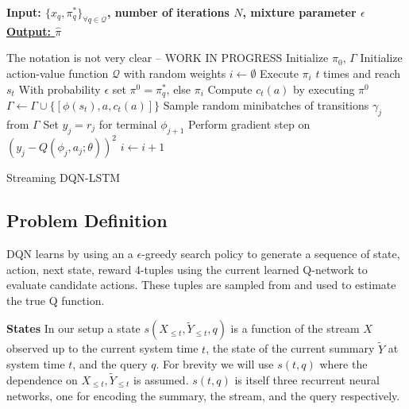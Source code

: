 \documentclass[12pt]{article}
\begin{document}
\begin{algorithm}
    \bf{Input:} { \rm $\{ x_q, \pi^{*}_q \}_{\forall q \in \mathcal{Q} }$, number of iterations $N$, mixture parameter $\epsilon$  } \\
    \underline{\bf{Output:}  $\hat{\pi}$ }
  \begin{algorithmic}[1]
  \STATE The notation is not very clear -- WORK IN PROGRESS
  \STATE \rm Initialize $\pi_0$, $\Gamma$
  \STATE \rm Initialize action-value function $\mathcal{Q}$ with random weights
    \STATE \rm $i \leftarrow \emptyset$ 
        \STATE \rm Execute $\pi_i$ $t$ times and reach $s_t$
        		\STATE \rm With probability $\epsilon$ set $\pi^0 = \pi^{*}_q$, else $\pi_i$
		\STATE Compute $c_t(a)$ by executing $\pi^0$
		\STATE $\Gamma \leftarrow \Gamma \cup \{ [\phi(s_t), a, c_t(a)]\}$
		\ENDFOR
        \ENDFOR
        \STATE Sample random minibatches of transitions $\gamma_j$ from $\Gamma$
        \STATE Set $y_j = r_j$ for terminal $\phi_{j+1}$
        \STATE Perform gradient step on $(y_j - Q(\phi_j, a_j; \theta))^2$
        \STATE $i \leftarrow i + 1$
      \ENDFOR
    \ENDFOR
  \end{algorithmic}
    \caption{Streaming DQN-LSTM}
\end{algorithm}


\subsection{Problem Definition}
   
    DQN learns by using an a $\epsilon$-greedy search policy to generate a 
    sequence of state, action, next state, reward 4-tuples using the current
    learned Q-network to evaluate candidate actions. These tuples are sampled
    from and used to estimate the true Q function.

    \textbf{States} 
    In our setup a state $s(X_{\le t},\tilde{Y}_{\le t}, q)$ is a function
    of the stream $X$ observed up to the current system time $t$, the state
    of the current summary $\tilde{Y}$ at system time $t$, and the query $q$.
    For brevity we will use $s(t,q)$ where the dependence on 
    $X_{\le t},\tilde{Y}_{\le t}$ is assumed.
    $s(t,q)$ is itself three recurrent neural networks, one for encoding 
    the summary, the stream, and the query respectively.
\end{document}
